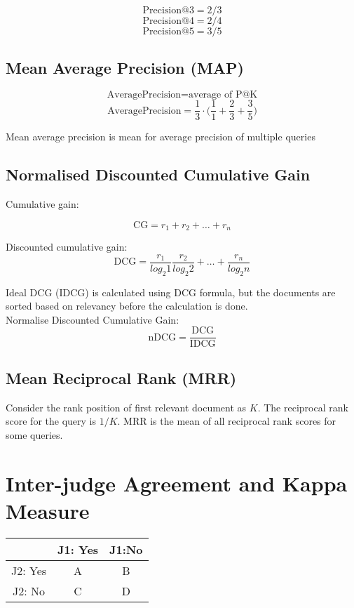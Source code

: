 \begin{multicols*}{2}
$$\text{Precision@3} = 2 / 3$$
$$\text{Precision@4} = 2 / 4$$
$$\text{Precision@5} = 3 / 5$$

\subsection{Mean Average Precision (MAP)}

$$\text{AveragePrecision} = \text{average of P@K}$$
$$\text{AveragePrecision} = \frac{1}{3} \cdot \Big(\frac{1}{1} + \frac{2}{3} + \frac{3}{5} \Big)$$

\noindent Mean average precision is mean for average precision of multiple queries

\subsection{Normalised Discounted Cumulative Gain}

\noindent Cumulative gain:

$$\text{CG}=r_1 + r_2 + \ldots + r_n$$

\noindent Discounted cumulative gain:
$$\text{DCG} = \frac{r_1}{log_2 1} \frac{r_2}{log_2 2} + \ldots + \frac{r_n}{log_2 n}$$

\noindent Ideal DCG (IDCG) is calculated using DCG formula, but the documents are sorted based on relevancy before the calculation is done. \\

\noindent Normalise Discounted Cumulative Gain:
$$\text{nDCG} = \frac{\text{DCG}}{\text{IDCG}}$$

\subsection{Mean Reciprocal Rank (MRR)}

\noindent Consider the rank position of first relevant document as $K$. The reciprocal rank score for the query is $1 / K$. MRR is the mean of all reciprocal rank scores for some queries. 

\section{Inter-judge Agreement and Kappa Measure}

\begin{center}
\begin{tabular}{ |c|c c| } 
    \hline
     & J1: Yes & J1:No \\
    \hline 
    J2: Yes & A & B \\
    J2: No & C & D \\
    \hline
\end{tabular}
\end{center}


\end{multicols*}
